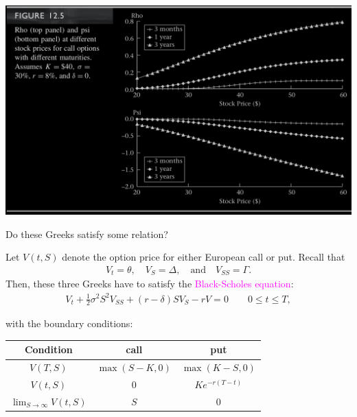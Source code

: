 \begin{frame}[fragile]
\begin{center}
	\includegraphics[scale=0.2]{figs/Figure-12-5.png}
\end{center}
\end{frame}
\begin{frame}[fragile,t]
\begin{center}
	Do these Greeks satisfy some relation?
\end{center}
\pause
\bigskip
\mySeparateLine
\bigskip
\begin{mythm}
	Let $V(t,S)$ denote the option price for either European call or put. Recall that
	\begin{align*}
		V_t = \theta, \quad V_S = \Delta, \quad \text{and} \quad V_{SS} = \Gamma.
	\end{align*}
	Then, these three Greeks have to satisfy the \textcolor{magenta}{Black-Scholes equation}:
	\bigskip
	\begin{align}
		\label{E:BSEq}
		\tag{BS}
		\boxed{V_t + \frac{1}{2}\sigma^2 S^2 V_{SS} + (r-\delta) S V_S - r V = 0} \qquad 0 \le t \le T,
	\end{align}
	\bigskip

	with the boundary conditions:
	\bigskip

	\begin{center}
	\renewcommand{\arraystretch}{1.2}
		\begin{tabular}{|c|c|c|}
			\hline
			Condition                  & call          & put             \\ \hline
			$V(T,S)$                   & $\max(S-K,0)$ & $\max(K-S,0)$   \\
			$V(t,S)$                   & $0$           & $K e^{-r(T-t)}$ \\
			$\lim_{S\to\infty} V(t,S)$ & $S$           & $0$             \\ \hline
		\end{tabular}
	\end{center}
\end{mythm}
\end{frame}
